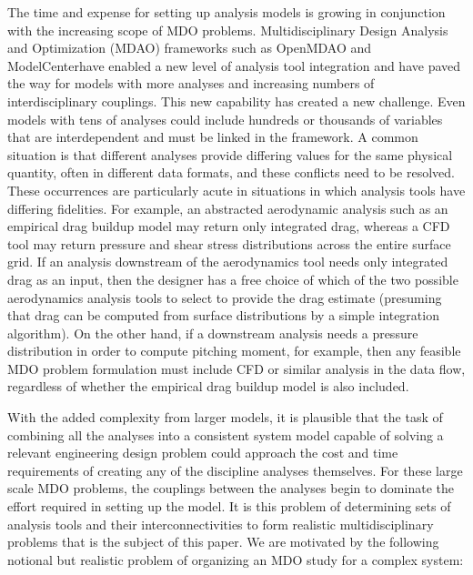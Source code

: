     The time and expense for setting up 
    analysis models is growing in conjunction with the increasing scope of MDO problems. 
    Multidisciplinary Design Analysis and Optimization (MDAO)
    frameworks such as OpenMDAO \cite{Gray2012} and {ModelCenter}\textregistered have enabled a new level of analysis tool integration 
    and have paved the way for models with more analyses and increasing numbers of interdisciplinary couplings. This 
    new capability has created a new challenge. Even models with tens of analyses could include hundreds or thousands
    of variables that are interdependent and must be linked in the framework. 
    A common situation is that different analyses provide differing values for the 
    same physical quantity, often in different data formats, and these conflicts need to be resolved. 
    These occurrences are particularly acute in situations in which analysis tools have differing fidelities. For
    example, an abstracted aerodynamic analysis such as an empirical drag buildup model may return only
    integrated drag, whereas a CFD tool may return pressure and shear stress distributions across the entire
    surface grid. If an analysis downstream of the aerodynamics tool needs only integrated drag as an input,
    then the designer has a free choice of which of the two possible aerodynamics analysis tools to select to
    provide the drag estimate (presuming that drag can be computed from surface distributions by a simple
    integration algorithm). On the other hand, if a downstream analysis needs a pressure distribution in
    order to compute pitching moment, for example, then any feasible MDO problem formulation must
    include CFD or similar analysis in the data flow, regardless of whether the empirical drag buildup model
    is also included.

    With the added complexity from larger models, it is plausible that the task of combining all the analyses into a 
    consistent system model capable of solving a relevant engineering design 
    problem could approach the cost and time requirements of creating any of the discipline 
    analyses themselves. For these large scale MDO problems, the couplings between the 
    analyses begin to dominate the effort required in setting up the model. It is this problem of 
    determining sets of analysis tools and their interconnectivities to form realistic
    multidisciplinary problems that is the subject of this paper. We are motivated by the following notional
    but realistic problem of organizing an MDO study for a complex system:

